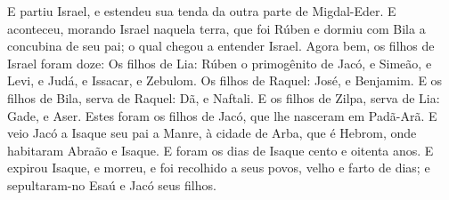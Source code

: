 {{  E partiu Israel, e estendeu sua tenda da outra parte de Migdal-Eder.
  E aconteceu, morando Israel naquela terra, que foi Rúben e dormiu com Bila a concubina de seu pai; o qual chegou a entender Israel. Agora bem, os filhos de Israel foram doze:
  Os filhos de Lia: Rúben o primogênito de Jacó, e Simeão, e Levi, e Judá, e Issacar, e Zebulom.
  Os filhos de Raquel: José, e Benjamim.
  E os filhos de Bila, serva de Raquel: Dã, e Naftali.
  E os filhos de Zilpa, serva de Lia: Gade, e Aser. Estes foram os filhos de Jacó, que lhe nasceram em Padã-Arã.
  E veio Jacó a Isaque seu pai a Manre, à cidade de Arba, que é Hebrom, onde habitaram Abraão e Isaque.
  E foram os dias de Isaque cento e oitenta anos.
  E expirou Isaque, e morreu, e foi recolhido a seus povos, velho e farto de dias; e sepultaram-no Esaú e Jacó seus filhos.
\par }

}
